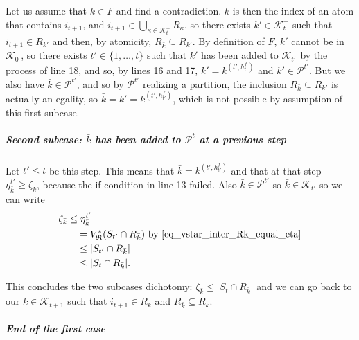 \documentclass[
  11pt,
  a4paper,
]{article}
\let\oldsubparagraph\subparagraph
\renewcommand{\subparagraph}[1]{\oldsubparagraph{#1}\mbox{}}
\theoremstyle{definition}
\theoremstyle{plain}
\theoremstyle{plain}
\theoremstyle{plain}
\theoremstyle{definition}
\theoremstyle{remark}
\begin{document}
Let us assume that \(\bar k\in F\) and find a contradiction. \(\bar k\)
is then the index of an atom that contains \(i_{t+1}\), and
\(i_{t+1}\in\bigcup_{\kappa\in\mathcal{K}^-_{t}}R_{\kappa}\), so there
exists \(k'\in\mathcal{K}^-_{t}\) such that \(i_{t+1}\in R_{k'}\) and
then, by atomicity, \(R_{\bar k}\subseteq R_{k'}\). By definition of
\(F\), \(k'\) cannot be in \(\mathcal{K}_0^-\), so there exists
\(t'\in\{1,\dotsc,t\}\) such that \(k'\) has been added to
\(\mathcal{K}^-_{t'}\) by the process of line 18, and so, by lines 16
and 17, \(k'=k^{(t',h^f_{t'})}\) and \(k'\in\mathcal{P}^{t'}\). But we
also have \(\bar k\in\mathcal{P}^{t'}\), and so by \(\mathcal{P}^{t'}\)
realizing a partition, the inclusion \(R_{\bar k}\subseteq R_{k'}\) is
actually an egality, so \(\bar k = k' = k^{(t',h^f_{t'})}\), which is
not possible by assumption of this first subcase.

\subparagraph{\texorpdfstring{Second subcase: \(\bar k\) has been added
to \(\mathcal{P}^t\) at a previous
step}{Second subcase: \textbackslash bar k has been added to \textbackslash mathcal\{P\}\^{}t at a previous step}}\label{second-subcase-bar-k-has-been-added-to-mathcalpt-at-a-previous-step}

Let \(t'\leq t\) be this step. This means that
\(\bar k = k^{(t',h^f_{t'})}\) and that at that step
\(\eta^{t'}_{\bar k}\geq \zeta_{\bar k}\), because the if condition in
line 13 failed. Also \(\bar k\in \mathcal{P}^{t'}\) so
\(\bar k\in \mathcal{K}_{t'}\) so we can write \begin{align*}
\zeta_{\bar k}&\leq\eta^{t'}_{\bar k}\\
&\quad=V^*_{\mathfrak{R}}(S_{t'}\cap R_{\bar k})  \text{ by~\eqref{eq_vstar_inter_Rk_equal_eta}} \\
&\quad\leq | S_{t'}\cap R_{\bar k} |\\
&\quad\leq  | S_{t}\cap R_{\bar k} |.\\
\end{align*}

This concludes the two subcases dichotomy:
\(\zeta_{\bar k}\leq |S_t\cap R_{\bar k}|\) and we can go back to our
\(k\in\mathcal{K}_{t+1}\) such that \(i_{t+1}\in R_k\) and
\(R_{\bar k}\subseteq R_k\).

\subparagraph{End of the first case}\label{end-of-the-first-case}
\end{document}
